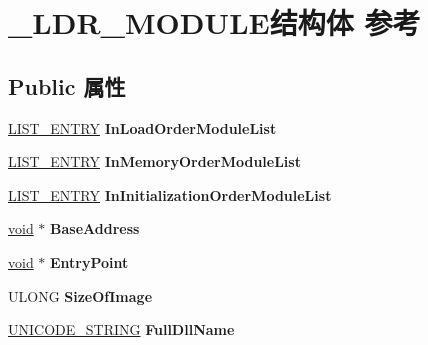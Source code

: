 \hypertarget{struct___l_d_r___m_o_d_u_l_e}{}\section{\+\_\+\+L\+D\+R\+\_\+\+M\+O\+D\+U\+L\+E结构体 参考}
\label{struct___l_d_r___m_o_d_u_l_e}
\subsection*{Public 属性}
\begin{DoxyCompactItemize}
\item 
\mbox{\label{struct___l_d_r___m_o_d_u_l_e_a1034b510d0307a0158f51e67c526cfda}} 
\hyperlink{struct___l_i_s_t___e_n_t_r_y}{L\+I\+S\+T\+\_\+\+E\+N\+T\+RY} {\bfseries In\+Load\+Order\+Module\+List}
\item 
\mbox{\label{struct___l_d_r___m_o_d_u_l_e_aa16b1120d4366b1311fa733830225bb2}} 
\hyperlink{struct___l_i_s_t___e_n_t_r_y}{L\+I\+S\+T\+\_\+\+E\+N\+T\+RY} {\bfseries In\+Memory\+Order\+Module\+List}
\item 
\mbox{\label{struct___l_d_r___m_o_d_u_l_e_afa60b7b3ededc8a73d787b4a91293669}} 
\hyperlink{struct___l_i_s_t___e_n_t_r_y}{L\+I\+S\+T\+\_\+\+E\+N\+T\+RY} {\bfseries In\+Initialization\+Order\+Module\+List}
\item 
\mbox{\label{struct___l_d_r___m_o_d_u_l_e_ac1e771f5736a9d5d9a5d41cc94161587}} 
\hyperlink{interfacevoid}{void} $\ast$ {\bfseries Base\+Address}
\item 
\mbox{\label{struct___l_d_r___m_o_d_u_l_e_a7834d9a3fce5c1f20dfb15c959187a60}} 
\hyperlink{interfacevoid}{void} $\ast$ {\bfseries Entry\+Point}
\item 
\mbox{\label{struct___l_d_r___m_o_d_u_l_e_a2d1ab5c58f2176667b85246bd54355ff}} 
U\+L\+O\+NG {\bfseries Size\+Of\+Image}
\item 
\mbox{\label{struct___l_d_r___m_o_d_u_l_e_a16913d808e5ef65c64884f8f439b1b47}} 
\hyperlink{struct___u_n_i_c_o_d_e___s_t_r_i_n_g}{U\+N\+I\+C\+O\+D\+E\+\_\+\+S\+T\+R\+I\+NG} {\bfseries Full\+Dll\+Name}

\end{DoxyCompactItemize}

